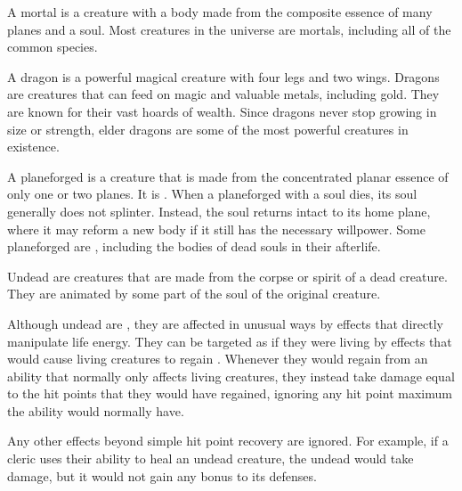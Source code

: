   A mortal is a creature with a body made from the composite essence of many planes and a soul.
  Most creatures in the universe are mortals, including all of the common species.

   A dragon is a powerful magical creature with four legs and two wings.
  Dragons are  creatures that can feed on magic and valuable metals, including gold. 
  They are known for their vast hoards of wealth.
  Since dragons never stop growing in size or strength, elder dragons are some of the most powerful creatures in existence.

  A planeforged is a creature that is made from the concentrated planar essence of only one or two planes.
  It is .
  When a planeforged with a soul dies, its soul generally does not splinter.
  Instead, the soul returns intact to its home plane, where it may reform a new body if it still has the necessary willpower.
  Some planeforged are , including the bodies of dead souls in their afterlife.

  Undead are creatures that are made from the corpse or spirit of a dead creature.
  They are animated by some part of the soul of the original creature.

  Although undead are , they are affected in unusual ways by effects that directly manipulate life energy.
  They can be targeted as if they were living  by \magical effects that would cause living creatures to regain .
  Whenever they would regain  from an ability that normally only affects living creatures, they instead take damage equal to the hit points that they would have regained, ignoring any hit point maximum the ability would normally have.

  Any other effects beyond simple hit point recovery are ignored.
  For example, if a cleric uses their  ability to heal an undead creature, the undead would take damage, but it would not gain any bonus to its defenses.

